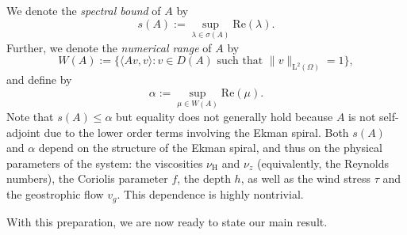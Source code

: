 \documentclass[preprint]{elsarticle}
\numberwithin{equation}{section}
\renewcommand{\Re}{\mathrm{Re}}
\renewcommand{\H}{\mathrm{H}}
\newcommand{\sigmabar}{\bar{\sigma}}
\renewcommand{\bar}[1]{\overline{#1}}
\newcommand{\rL}{\mathrm{L}}
\newcommand{\rH}{\H}
\begin{document}
We denote the \emph{spectral bound} of $A$ by
\begin{equation*}
	s(A) := \sup_{\lambda \in \sigma(A)} \Re (\lambda) .
\end{equation*}
Further, we denote the \emph{numerical range} of $A$ by
\begin{equation*}
	W(A) := \{ \langle A v , v \rangle \colon v \in D(A) \text{ such that } \| v \|_{\rL^2(\Omega)} = 1 \},
\end{equation*}
and define by
\begin{equation*}
	\alpha := \sup_{\mu \in W(A)} \Re (\mu) . 
\end{equation*} 
Note that $s(A) \leq \alpha$ but equality does not generally hold because $A$ is not self-adjoint due to the lower order terms involving the Ekman spiral.
Both $s(A)$ and $\alpha$ depend on the structure of the Ekman spiral, and thus on the physical parameters of the system: the viscosities $\nu_{\rH}$ and $\nu_z$ (equivalently, the Reynolds numbers), the Coriolis parameter $f$, the depth $h$, as well as the wind stress $\tau$ and the geostrophic flow $v_g$. This dependence is highly nontrivial.

\smallskip   

With this preparation, we are now ready to state our main result.  
\end{document}

